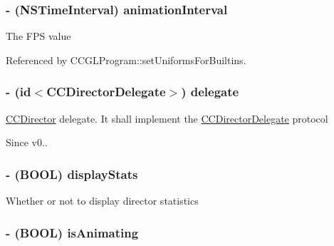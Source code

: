 \hypertarget{class_c_c_director_a5931f953b43d501fe234fbdcadd312da}{
\subsubsection[{animation\-Interval}]{\setlength{\rightskip}{0pt plus 5cm}-\/ (N\-S\-Time\-Interval) {\bf animation\-Interval}}}\label{class_c_c_director_a5931f953b43d501fe234fbdcadd312da}
The F\-P\-S value 

Referenced by C\-C\-G\-L\-Program\-::set\-Uniforms\-For\-Builtins.

\hypertarget{class_c_c_director_a0b46357f83bf6ce9143b0ad4f2aa4a42}{
\subsubsection[{delegate}]{\setlength{\rightskip}{0pt plus 5cm}-\/ (id$<${\bf C\-C\-Director\-Delegate}$>$) {\bf delegate}}}\label{class_c_c_director_a0b46357f83bf6ce9143b0ad4f2aa4a42}
\hyperlink{class_c_c_director}{C\-C\-Director} delegate. It shall implement the \hyperlink{protocol_c_c_director_delegate-p}{C\-C\-Director\-Delegate} protocol \begin{DoxySince}{Since}
v0.. 
\end{DoxySince}
\hypertarget{class_c_c_director_a750f72a036194b76db50c572686020ea}{
\subsubsection[{display\-Stats}]{\setlength{\rightskip}{0pt plus 5cm}-\/ (B\-O\-O\-L) {\bf display\-Stats}}}\label{class_c_c_director_a750f72a036194b76db50c572686020ea}
Whether or not to display director statistics \hypertarget{class_c_c_director_adf3e09b6bf13f28b6ca52cdec4c4643b}{
\subsubsection[{is\-Animating}]{\setlength{\rightskip}{0pt plus 5cm}-\/ (B\-O\-O\-L) {\bf is\-Animating}}}\label{class_c_c_director_adf3e09b6bf13f28b6ca52cdec4c4643b}
